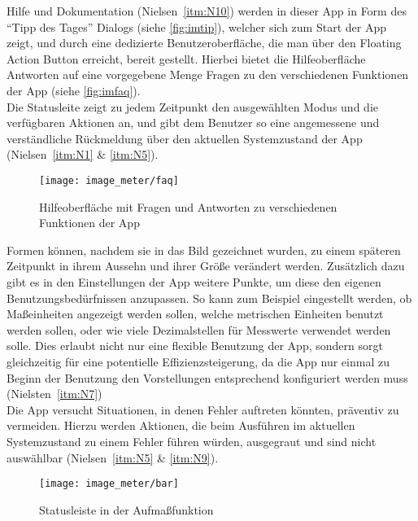 Hilfe und Dokumentation (Nielsen~\autoref{itm:N10}) werden in dieser App in Form des ``Tipp des Tages'' Dialogs (siehe \autoref{fig:imtip}), welcher sich zum Start der App zeigt, und durch eine dedizierte Benutzeroberfläche, die man über den Floating Action Button erreicht, bereit gestellt. 
Hierbei bietet die Hilfeoberfläche Antworten auf eine vorgegebene Menge Fragen zu den verschiedenen Funktionen der App (siehe \autoref{fig:imfaq}). \\

Die Statusleite zeigt zu jedem Zeitpunkt den ausgewählten Modus und die verfügbaren Aktionen an, und gibt dem Benutzer so eine angemessene und verständliche Rückmeldung über den aktuellen Systemzustand der App (Nielsen~\autoref{itm:N1} \& \autoref{itm:N5}).

\begin{wrapfigure}{R}{0.5\textwidth}
  \centering
  \texttt{[image: image\_meter/faq]}
  \caption{Hilfeoberfläche mit Fragen und Antworten zu verschiedenen Funktionen der App}
  \label{fig:imfaq}
\end{wrapfigure}

Formen können, nachdem sie in das Bild gezeichnet wurden, zu einem späteren Zeitpunkt in ihrem Aussehn und ihrer Größe verändert werden. Zusätzlich dazu gibt es in den Einstellungen der App weitere Punkte, um diese den eigenen Benutzungsbedürfnissen anzupassen.
So kann zum Beispiel eingestellt werden, ob Maßeinheiten angezeigt werden sollen, welche metrischen Einheiten benutzt werden sollen, oder wie viele Dezimalstellen für Messwerte verwendet werden solle.
Dies erlaubt nicht nur eine flexible Benutzung der App, sondern sorgt gleichzeitig für eine potentielle Effizienzsteigerung, da die App nur einmal zu Beginn der Benutzung den Vorstellungen entsprechend konfiguriert werden muss (Nielsten~\autoref{itm:N7}) \\

Die App versucht Situationen, in denen Fehler auftreten könnten, präventiv zu vermeiden.
Hierzu werden Aktionen, die beim Ausführen im aktuellen Systemzustand zu einem Fehler führen würden, ausgegraut und sind nicht auswählbar (Nielsen~\autoref{itm:N5} \& \autoref{itm:N9}).

\begin{wrapfigure}{R}{0.5\textwidth}
  \centering
  \texttt{[image: image\_meter/bar]}
  \caption{Statusleiste in der Aufmaßfunktion}
  \label{fig:imbar}
\end{wrapfigure}

